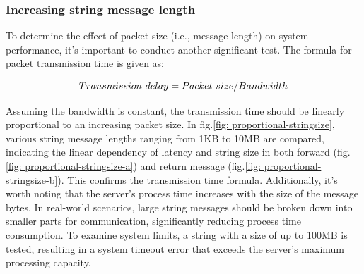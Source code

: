\subsubsection{Increasing string message length}\label{chap: Result-Internal-string}
To determine the effect of packet size (i.e., message length) on system performance, 
it's important to conduct another significant test. The formula for packet transmission 
time is given as:


\begin{equation}
    Transmission $ $ delay = Packet $ $ size/Bandwidth
\end{equation}

Assuming the bandwidth is constant, the transmission time should be linearly proportional 
to an increasing packet size. In fig.\ref{fig: proportional-stringsize}, various string 
message lengths ranging from 1KB to 10MB are compared, indicating the linear dependency 
of latency and string size in both forward (fig.\ref{fig: proportional-stringsize-a}) 
and return message (fig.\ref{fig: proportional-stringsize-b}). This confirms the 
transmission time formula. Additionally, it's worth noting that the server's process 
time increases with the size of the message bytes. In real-world scenarios, large string 
messages should be broken down into smaller parts for communication, significantly 
reducing process time consumption. To examine system limits, a string with a size of 
up to 100MB is tested, resulting in a system timeout error that exceeds the server's 
maximum processing capacity.

